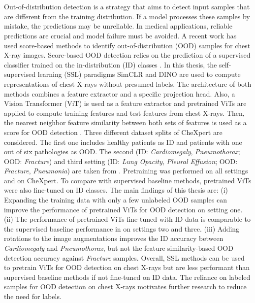 \section*{}
Out-of-distribution detection is a strategy that aims to detect input samples that are different from the training distribution.
If a model processes these samples by mistake, the predictions may be unreliable.
In medical applications, reliable predictions are crucial and model failure must be avoided.
A recent work \citep{Berger2021} has used score-based methods to identify out-of-distribution (OOD) samples for chest X-ray images.
Score-based OOD detection relies on the prediction of a supervised classifier trained on the in-distribution (ID) classes \citep{Yang2021}.
In this thesis, the self-supervised learning (SSL) paradigms SimCLR \citep{Chen2020} and DINO \citep{Caron2021} are used to compute representations of chest X-rays without presumed labels.
The architecture of both methods combines a feature extractor and a specific projection head.
Also, a Vision Transformer (ViT) \citep{Dosovitskiy2020} is used as a feature extractor and pretrained ViTs are applied to compute training features and test features from chest X-rays.
Then, the nearest neighbor feature similarity between both sets of features is used as a score for OOD detection \citep{Michels2023,Sun2022}.
Three different dataset splits of CheXpert \citep{Irvin2019} are considered.
The first one includes healthy patients as ID and patients with one out of six pathologies as OOD.
The second (ID: \textit{Cardiomegaly}, \textit{Pneumothorax}; OOD: \textit{Fracture}) and third setting (ID: \textit{Lung Opacity}, \textit{Pleural Effusion}; OOD: \textit{Fracture}, \textit{Pneumonia}) are taken from \citep{Berger2021}.
Pretraining was performed on all settings and on CheXpert.
To compare with supervised baseline methods, pretrained ViTs were also fine-tuned on ID classes.
The main findings of this thesis are:
(i) Expanding the training data with only a few unlabeled OOD samples \citep{Fort2021} can improve the performance of pretrained ViTs for OOD detection on setting one.
(ii) The performance of pretrained ViTs fine-tuned with ID data is comparable to the supervised baseline performance in \citep{Berger2021} on settings two and three.
(iii) Adding rotations to the image augmentations improves the ID accuracy between \textit{Cardiomegaly} and \textit{Pneumothorax}, but not the feature similarity-based OOD detection accuracy against \textit{Fracture} samples.
Overall, SSL methods can be used to pretrain ViTs for OOD detection on chest X-rays but are less performant than supervised baseline methods if not fine-tuned on ID data.
The reliance on labeled samples for OOD detection on chest X-rays motivates further research to reduce the need for labels.
